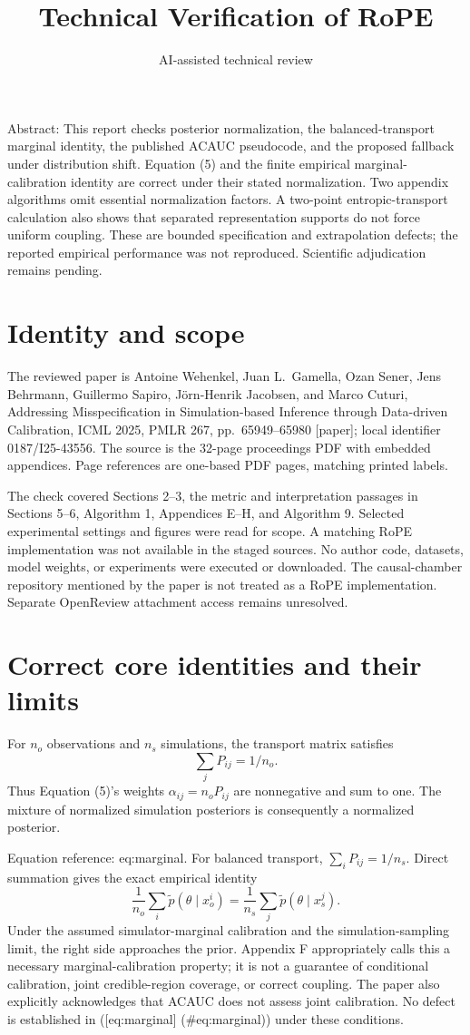 \documentclass[10pt]{article}
\title{Technical Verification of RoPE}
\author{AI-assisted technical review}
\date{}
\begin{document}
\maketitle
Abstract: This report checks posterior normalization, the balanced-transport marginal identity, the published ACAUC pseudocode, and the proposed fallback under distribution shift. Equation (5) and the finite empirical marginal-calibration identity are correct under their stated normalization. Two appendix algorithms omit essential normalization factors. A two-point entropic-transport calculation also shows that separated representation supports do not force uniform coupling. These are bounded specification and extrapolation defects; the reported empirical performance was not reproduced. Scientific adjudication remains pending.\par
\section*{Identity and scope}
The reviewed paper is Antoine Wehenkel, Juan L. Gamella, Ozan Sener, Jens Behrmann, Guillermo Sapiro, Jörn-Henrik Jacobsen, and Marco Cuturi, Addressing Misspecification in Simulation-based Inference through Data-driven Calibration, ICML 2025, PMLR 267, pp. 65949–65980 [paper]; local identifier 0187/I25-43556. The source is the 32-page proceedings PDF with embedded appendices. Page references are one-based PDF pages, matching printed labels.\par
The check covered Sections 2–3, the metric and interpretation passages in Sections 5–6, Algorithm 1, Appendices E–H, and Algorithm 9. Selected experimental settings and figures were read for scope. A matching RoPE implementation was not available in the staged sources. No author code, datasets, model weights, or experiments were executed or downloaded. The causal-chamber repository mentioned by the paper is not treated as a RoPE implementation. Separate OpenReview attachment access remains unresolved.\par
\section*{Correct core identities and their limits}
For \(n_o\) observations and \(n_s\) simulations, the transport matrix satisfies \[\sum_jP_{ij}=1/n_o.\] Thus Equation (5)’s weights \(\alpha_{ij}=n_oP_{ij}\) are nonnegative and sum to one. The mixture of normalized simulation posteriors is consequently a normalized posterior.\par
Equation reference: eq:marginal. For balanced transport, \(\sum_iP_{ij}=1/n_s\). Direct summation gives the exact empirical identity \[
\frac1{n_o}\sum_i\widetilde p(\theta\mid x_o^i)
=\frac1{n_s}\sum_j\widetilde p(\theta\mid x_s^j).\] Under the assumed simulator-marginal calibration and the simulation-sampling limit, the right side approaches the prior. Appendix F appropriately calls this a necessary marginal-calibration property; it is not a guarantee of conditional calibration, joint credible-region coverage, or correct coupling. The paper also explicitly acknowledges that ACAUC does not assess joint calibration. No defect is established in ([eq:marginal] (\#eq:marginal)) under these conditions.\par
\end{document}
